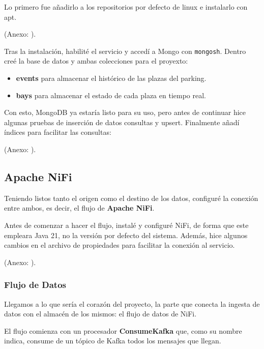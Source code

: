 \documentclass{../../../miPlantilla}
\begin{document}
Lo primero fue añadirlo a los repositorios por defecto de linux e instalarlo con apt.
\begin{center}
  {\small(Anexo: )}.
\end{center}

Tras la instalación, habilité el servicio y accedí a Mongo con \texttt{mongosh}. Dentro creé la base de datos y ambas colecciones para el proyexto:
\begin{itemize}
  \item \textbf{events} para almacenar el histórico de las plazas del parking.
  \item \textbf{bays} para almacenar el estado de cada plaza en tiempo real.
\end{itemize}

Con esto, MongoDB ya estaría listo para su uso, pero antes de continuar hice algunas pruebas de inserción de datos consultas y upsert. Finalmente añadí índices
para facilitar las consultas:
\begin{center}
  {\small(Anexo: )}.
\end{center}

\newpage

\subsection{Apache NiFi}
Teniendo listos tanto el origen como el destino de los datos, configuré la conexión entre ambos, es decir, el flujo de \textbf{Apache NiFi}.

Antes de comenzar a hacer el flujo, instalé y configuré NiFi, de forma que este empleara Java 21, no la versión por defecto del sistema.
Además, hice algunos cambios en el archivo de propiedades para facilitar la conexión al servicio.
\begin{center}
  {\small(Anexo: )}.
\end{center}

\subsubsection{Flujo de Datos}
Llegamos a lo que sería el corazón del proyecto, la parte que conecta la ingesta de datos con el almacén de los mismos: el flujo de datos de NiFi.

El flujo comienza con un procesador \textbf{ConsumeKafka} que, como su nombre indica, consume de un tópico de Kafka todos los mensajes que llegan.
\end{document}
